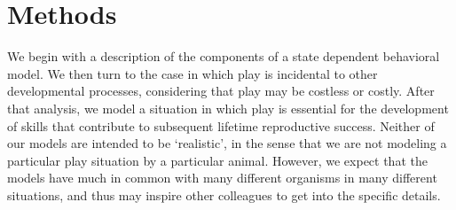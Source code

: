 \documentclass[12pt, letterpaper, fleqn]{article}
\begin{document}




%
%
\section*{Methods}
%
%

%
We begin with a description of the components of a state dependent behavioral model.  
%
We then turn to the case in which play is incidental to other developmental processes, considering that play may be costless or costly.
%
After that analysis, we model a situation in which play is essential for the development of skills that contribute to subsequent lifetime reproductive success.  
Neither of our models are intended to be `realistic', in the sense that we are not modeling a particular play situation by a particular animal. 
%
However, we expect that the models have much in common with many different organisms in many different situations, and thus may inspire other colleagues to get into the specific details.
\end{document}
